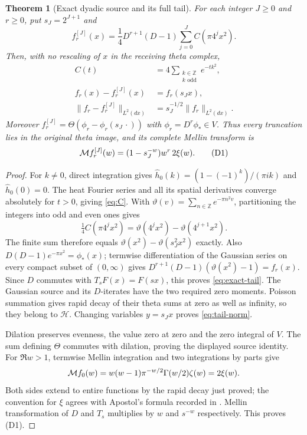 \documentclass[11pt]{article}
\newtheorem{theorem}{Theorem}[section]
\begin{document}
\begin{theorem}[Exact dyadic source and its full tail]\label{thm:dyadic}
For each integer $J\geq0$ and $r\geq0$, put $s_J=2^{J+1}$ and
\[
 f_r^{[J]}(x)=\frac14D^{r+1}(D-1)
                 \sum_{j=0}^{J}C(\pi4^j x^2).
\]
Then, with no rescaling of $x$ in the receiving theta complex,
\begin{align}
 C(t)&=4\sum_{\substack{k\in\mathbb Z\\k\text{ odd}}}e^{-tk^2},\label{eq:C}\\
 f_r(x)-f_r^{[J]}(x)&=f_r(s_Jx),\label{eq:exact-tail}\\
 \|f_r-f_r^{[J]}\|_{L^2(dx)}&=s_J^{-1/2}\|f_r\|_{L^2(dx)}.\label{eq:tail-norm}
\end{align}
Moreover $f_r^{[J]}=\Theta(\phi_r-\phi_r(s_J\,\cdot))$ with
$\phi_r=D^r\phi_*\in V$. Thus every truncation lies in the original
theta image, and its complete Mellin transform is
\[
 \mathcal M f_r^{[J]}(w)=(1-s_J^{-w})w^r\,2\xi(w).
 \tag{D1}
\]
\end{theorem}
\begin{proof}
For $k\ne0$, direct integration gives
$\widehat h_0(k)=(1-(-1)^k)/(\pi i k)$ and $\widehat h_0(0)=0$.
The heat Fourier series and all its spatial derivatives converge absolutely
for $t>0$, giving \eqref{eq:C}. With
$\vartheta(v)=\sum_{n\in\mathbb Z}e^{-\pi n^2v}$, partitioning the
integers into odd and even ones gives
\[
 \tfrac14 C(\pi4^j x^2)=\vartheta(4^jx^2)-\vartheta(4^{j+1}x^2).
\]
The finite sum therefore equals
$\vartheta(x^2)-\vartheta(s_J^2x^2)$ exactly. Also
$D(D-1)e^{-\pi x^2}=\phi_*(x)$; termwise differentiation of the
Gaussian series on every compact subset of $(0,\infty)$ gives
$D^{r+1}(D-1)(\vartheta(x^2)-1)=f_r(x)$.
Since $D$ commutes with $T_sF(x)=F(sx)$, this proves
\eqref{eq:exact-tail}. The Gaussian source and its $D$-iterates have the
two required zero moments. Poisson summation gives rapid decay of their
theta sums at zero as well as infinity, so they belong to $\mathcal H$.
Changing variables $y=s_Jx$ proves \eqref{eq:tail-norm}.

Dilation preserves evenness, the value zero at zero and the zero integral
of $V$. The sum defining $\Theta$ commutes with dilation, proving the
displayed source identity. For $\Re w>1$, termwise Mellin integration and
two integrations by parts give
\[
 \mathcal M f_0(w)=w(w-1)\pi^{-w/2}\Gamma(w/2)\zeta(w)=2\xi(w).
\]
Both sides extend to entire functions by the rapid decay just proved;
the convention for $\xi$ agrees with Apostol's formula recorded in
\cite{DLMF25}. Mellin transformation of $D$ and $T_s$ multiplies by $w$
and $s^{-w}$ respectively. This proves (D1).
\end{proof}
\end{document}
